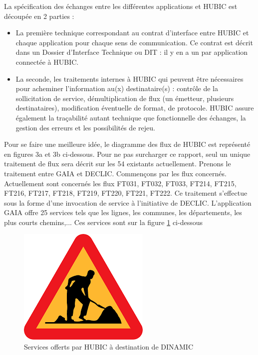 La spécification des échanges entre les différentes applications et HUBIC est découpée en 2
parties :
\begin{itemize}
\item La première technique correspondant au contrat d'interface entre HUBIC et chaque application
pour chaque sens de communication. Ce contrat est décrit dans un Dossier
d'Interface Technique ou DIT : il y en a un par application connectée à HUBIC.
\item La seconde, les traitements internes à HUBIC qui peuvent être nécessaires pour acheminer
l'information au(x) destinataire(s) : contrôle de la sollicitation de service, démultiplication
de flux (un émetteur, plusieurs destinataires), modification éventuelle de format, de
protocole. HUBIC assure également la traçabilité autant technique que fonctionnelle des
échanges, la gestion des erreurs et les possibilités de rejeu.
\end{itemize}
Pour se faire une meilleure idée, le diagramme des flux de HUBIC est représenté en figures 3a et
3b ci-dessous. Pour ne pas surcharger ce rapport, seul un unique traitement de flux sera décrit
sur les 54 existants actuellement. Prenons le traitement entre GAIA et DECLIC.
Commençons par les flux concernés. Actuellement sont concernés les flux FT031, FT032, FT033,
FT214, FT215, FT216, FT217, FT218, FT219, FT220, FT221, FT222.
Ce traitement s'effectue sous la forme d'une invocation de service à l'initiative de DECLIC.
L'application GAIA offre 25 services tels que les lignes, les communes, les départements, les
plus courts chemins,... Ces services sont sur la figure \ref{services} ci-dessous
\begin{figure}[h!]
	\centering
	\includegraphics[width=0.7\linewidth]{img/encours}
	\caption{Services offerts par HUBIC à destination de DINAMIC}
	\label{services}
\end{figure}


